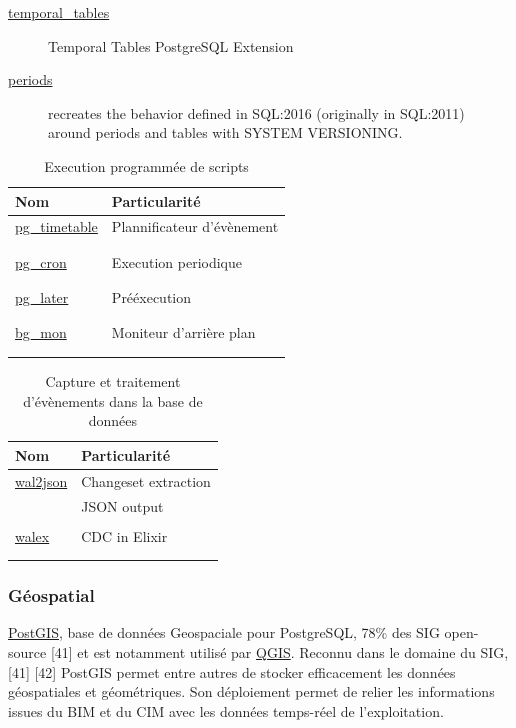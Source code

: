 \documentclass[a4paper,12pt]{article}
\begin{document}
\begin{multicols*}{2}
\begin{description}
\item[{\href{https://github.com/arkhipov/temporal\_tables}{temporal\_tables}}] Temporal Tables PostgreSQL Extension
\item[{\href{https://github.com/xocolatl/periods}{periods}}] recreates the behavior defined in SQL:2016 (originally in SQL:2011) around periods and tables with SYSTEM VERSIONING.
\end{description}

\begin{table}[H]
\caption{Execution programmée de scripts}
\centering
\begin{tabular}{ll}
Nom & Particularité\\
\hline
\href{https://github.com/cybertec-postgresql/pg\_timetable}{pg\_timetable} & Plannificateur d'évènement\\
 & \\
 & \\
\href{https://github.com/citusdata/pg\_cron}{pg\_cron} & Execution periodique\\
 & \\
 & \\
\href{https://github.com/tembo-io/pg\_later}{pg\_later} & Prééxecution\\
 & \\
 & \\
\href{https://github.com/CyberDem0n/bg\_mon}{bg\_mon} & Moniteur d'arrière plan\\
 & \\
 & \\
\end{tabular}
\end{table}

\begin{table}[H]
\caption{Capture et traitement d'évènements dans la base de données}
\centering
\begin{tabular}{ll}
Nom & Particularité\\
\hline
\href{https://github.com/eulerto/wal2json}{wal2json} & Changeset extraction\\
 & JSON output\\
 & \\
\href{https://github.com/cpursley/walex}{walex} & CDC in Elixir\\
 & \\
 & \\
\end{tabular}
\end{table}
\subsubsection*{Géospatial}
\label{sec:org9f9ce3f}
\href{https://github.com/postgis/postgis}{PostGIS}, base de données Geospaciale pour PostgreSQL, 78\% des SIG open-source [41] et est notamment utilisé par \href{https://qgis.org/}{QGIS}.
Reconnu dans le domaine du SIG, [41] [42] PostGIS permet entre autres de stocker efficacement les données géospatiales et géométriques. Son déploiement permet de relier les informations issues du BIM et du CIM avec les données temps-réel de l’exploitation.


\end{multicols*}
\end{document}
